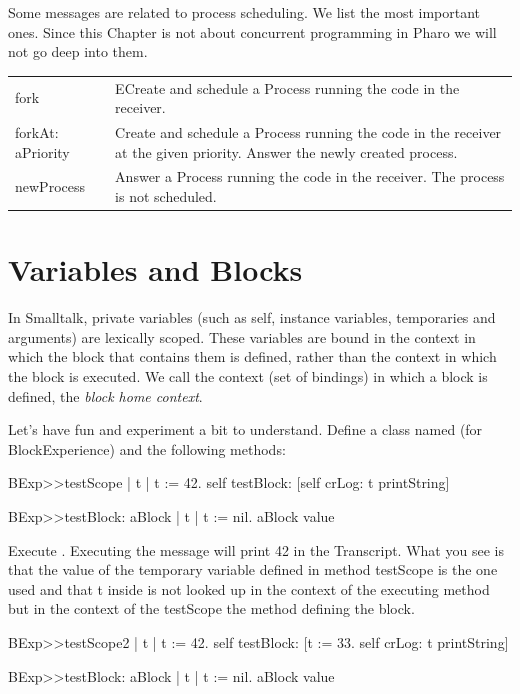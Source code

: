 \documentclass[a4paper,10pt,twoside]{book}
\begin{document}
Some messages are related to process scheduling. We list the most important ones. Since this Chapter is not about concurrent programming in Pharo we will not go deep into them.

\begin{tabular}{p{2cm}|p{8cm}}
\textsf{fork}&ECreate and schedule a Process running the code in the receiver.\\
\textsf{forkAt: aPriority}& Create and schedule a Process running the code in the receiver at the given priority. Answer the newly created process. \\
\textsf{newProcess}&Answer a Process running the code in the receiver. The process is not scheduled.\\
\end{tabular}


\section{Variables and Blocks}
In Smalltalk, private variables (such as self, instance variables, temporaries and arguments) are 
lexically scoped. These variables are bound in the context in which the block that contains them is defined, rather than the context in which the block is executed.  We call the context (set of bindings) in which a block is defined, the \emph{block home context}.


Let's have fun and experiment a bit to understand. 
Define a class named  (for BlockExperience) and the following methods:

\begin{code}{}
BExp>>testScope 
	| t | 
	t := 42. 
	self testBlock: [self crLog: t printString] 
	
BExp>>testBlock: aBlock 
	| t | 
	t := nil. 
	aBlock value 
\end{code}

Execute . Executing the  message will print 42 in the Transcript. What you see is that the value of the temporary variable  defined in method testScope is the one used and that t inside  is not looked up in the context of the executing method  but in the context of the testScope the method defining the block.

\begin{code}{}
BExp>>testScope2 
	| t | 
	t := 42. 
	self testBlock: [t := 33.
					self crLog: t printString] 	
	
BExp>>testBlock: aBlock
	| t | 
	t := nil. 
	aBlock value 
\end{code}
\end{document}
